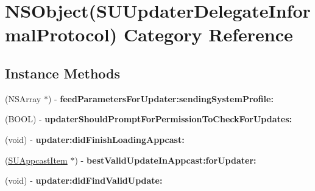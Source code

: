 \hypertarget{category_n_s_object_07_s_u_updater_delegate_informal_protocol_08}{}\section{N\+S\+Object(S\+U\+Updater\+Delegate\+Informal\+Protocol) Category Reference}
\label{category_n_s_object_07_s_u_updater_delegate_informal_protocol_08}
\subsection*{Instance Methods}
\begin{DoxyCompactItemize}
\item 
\mbox{\label{category_n_s_object_07_s_u_updater_delegate_informal_protocol_08_a6a14fca3f9275dc3c1bc61b2f0696938}} 
(N\+S\+Array $\ast$) -\/ {\bfseries feed\+Parameters\+For\+Updater\+:sending\+System\+Profile\+:}
\item 
\mbox{\label{category_n_s_object_07_s_u_updater_delegate_informal_protocol_08_a26fd64a862cb954c8e5bdae5b768ef5a}} 
(B\+O\+OL) -\/ {\bfseries updater\+Should\+Prompt\+For\+Permission\+To\+Check\+For\+Updates\+:}
\item 
\mbox{\label{category_n_s_object_07_s_u_updater_delegate_informal_protocol_08_aeddf46576356b1ad9ab409dc0eae5096}} 
(void) -\/ {\bfseries updater\+:did\+Finish\+Loading\+Appcast\+:}
\item 
\mbox{\label{category_n_s_object_07_s_u_updater_delegate_informal_protocol_08_a513cb4e0b03847e5e24020d269c090ba}} 
(\mbox{\hyperlink{interface_s_u_appcast_item}{S\+U\+Appcast\+Item}} $\ast$) -\/ {\bfseries best\+Valid\+Update\+In\+Appcast\+:for\+Updater\+:}
\item 
\mbox{\label{category_n_s_object_07_s_u_updater_delegate_informal_protocol_08_a05181fb779b775258e98c942c88ae8c5}} 
(void) -\/ {\bfseries updater\+:did\+Find\+Valid\+Update\+:}
\item 

\end{DoxyCompactItemize}
